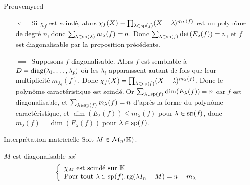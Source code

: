     \begin{demo}{Preuve}{myred}
        \begin{itemize}
            \item[$\impliedby$] Si $\chi_f$ est scindé, alors $\chi_f(X) = \prod_{\lambda \in \sp(f)} (X-\lambda)^{m_{\lambda}(f)}$ est un polynôme de degré $n$, donc $\sum_{\lambda \in \sp(\lambda)} m_{\lambda}(f) = n$. Donc $\sum_{\lambda \in \sp(f)} \det(E_{\lambda}(f)) = n$, et $f$ est diagonalisable par la proposition précédente.
            \item[$\implies$] Supposons $f$ diagonalisable. Alors $f$ est semblable à $D = \diag(\lambda_1,\ldots,\lambda_p)$ où les $\lambda_i$ apparaissent autant de fois que leur multiplicité $m_{\lambda_i}(f)$. Donc $\chi_f(X) = \prod_{\lambda \in \sp(f)} (X - \lambda)^{m_{\lambda}(f)}$. Donc le polynôme caractéristique est scindé. Or $\sum_{\lambda \in \sp(f)} \dim(E_{\lambda}(f)) = n$ car $f$ est diagonalisable, et $\sum_{\lambda \in \sp(f)} m_{\lambda}(f) = n$ d’après la forme du polynôme caractéristique, et $\dim(E_{\lambda}(f)) \leq m_{\lambda}(f)$ pour $\lambda \in \sp(f)$, donc $m_{\lambda}(f) = \dim(E_{\lambda}(f))$ pour $\lambda \in \sp(f)$.
        \end{itemize}
    \end{demo}

    \begin{coro}{Interprétation matricielle}{}
        Soit $M \in \mk{n}$.

        $M$ est diagonalisable \textit{ssi}
        \[ \et{\chi_M \text{ est scindé sur } \mathbb{K}}{\text{Pour tout } \lambda \in \sp(f), \rg(\lambda I_n - M) = n - m_{\lambda}} \]
    \end{coro}

